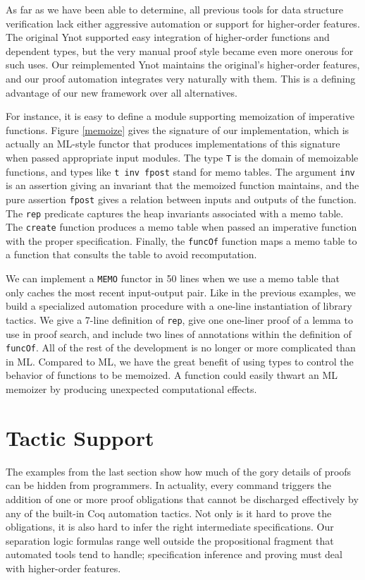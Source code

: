 \documentclass[preprint,nocopyrightspace]{sigplanconf}
\newcommand{\cd}[1]{\texttt{#1}}
\begin{document}
As far as we have been able to determine, all previous tools for data structure verification lack either aggressive automation or support for higher-order features.  The original Ynot supported easy integration of higher-order functions and dependent types, but the very manual proof style became even more onerous for such uses.  Our reimplemented Ynot maintains the original's higher-order features, and our proof automation integrates very naturally with them.  This is a defining advantage of our new framework over all alternatives.

For instance, it is easy to define a module supporting memoization of imperative functions.  Figure \ref{memoize} gives the signature of our implementation, which is actually an ML-style functor that produces implementations of this signature when passed appropriate input modules.  The type \cd{T} is the domain of memoizable functions, and types like \cd{t inv fpost} stand for memo tables.  The argument \cd{inv} is an assertion giving an invariant that the memoized function maintains, and the pure assertion \cd{fpost} gives a relation between inputs and outputs of the function.  The \cd{rep} predicate captures the heap invariants associated with a memo table.  The \cd{create} function produces a memo table when passed an imperative function with the proper specification.  Finally, the \cd{funcOf} function maps a memo table to a function that consults the table to avoid recomputation.

We can implement a \cd{MEMO} functor in 50 lines when we use a memo table that only caches the most recent input-output pair.  Like in the previous examples, we build a specialized automation procedure with a one-line instantiation of library tactics.  We give a 7-line definition of \cd{rep}, give one one-liner proof of a lemma to use in proof search, and include two lines of annotations within the definition of \cd{funcOf}.  All of the rest of the development is no longer or more complicated than in ML.  Compared to ML, we have the great benefit of using types to control the behavior of functions to be memoized.  A function could easily thwart an ML memoizer by producing unexpected computational effects.

  
\section{Tactic Support}

The examples from the last section show how much of the gory details of proofs can be hidden from programmers.  In actuality, every command triggers the addition of one or more proof obligations that cannot be discharged effectively by any of the built-in Coq automation tactics.  Not only is it hard to prove the obligations, it is also hard to infer the right intermediate specifications.  Our separation logic formulas range well outside the propositional fragment that automated tools tend to handle; specification inference and proving must deal with higher-order features.
\end{document}
